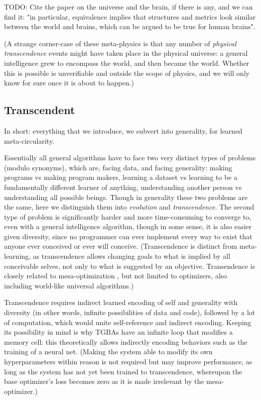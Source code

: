 \documentclass{article}
\begin{document}
    TODO: Cite the paper on the universe and the brain, if there is any, and we can find it: "in particular, equivalence implies that structures and metrics look similar between the world and brains, which can be argued to be true for human brains".

(A strange corner-case of these meta-physics is that any number of \textit{physical transcendence} events might have taken place in the physical universe: a general intelligence grew to encompass the world, and then became the world. Whether this is possible is unverifiable and outside the scope of physics, and we will only know for sure once it is about to happen.)

\subsection{Transcendent}

In short: everything that we introduce, we subvert into generality, for learned meta-circularity.

Essentially all general algorithms have to face two very distinct types of problems (modulo synonyms), which are, facing data, and facing generality: making programs vs making program makers, learning a dataset vs learning to be a fundamentally different learner of anything, understanding another person vs understanding all possible beings. Though in generality these two problems are the same, here we distinguish them into \textit{evolution} and \textit{transcendence}. The second type of problem is significantly harder and more time-consuming to converge to, even with a general intelligence algorithm, though in some sense, it is also easier given diversity, since no programmer can ever implement every way to exist that anyone ever conceived or ever will conceive. (Transcendence is distinct from meta-learning, as transcendence allows changing goals to what is implied by all conceivable selves, not only to what is suggested by an objective. Transendence is closely related to mesa-optimization \cite{hubinger2019risks}, but not limited to optimizers, also including world-like universal algorithms.)

Transcendence requires indirect learned encoding of self and generality with diversity (in other words, infinite possibilities of data and code), followed by a lot of computation, which would unite self-reference and indirect encoding. Keeping its possibility in mind is why TGBAs have an infinite loop that modifies a memory cell: this theoretically allows indirectly encoding behaviors such as the training of a neural net. (Making the system able to modify its own hyperparameters within reason is not required but may improve performance, as long as the system has not yet been trained to transcendence, whereupon the base optimizer's loss becomes zero as it is made irrelevant by the mesa-optimizer.)
\end{document}
